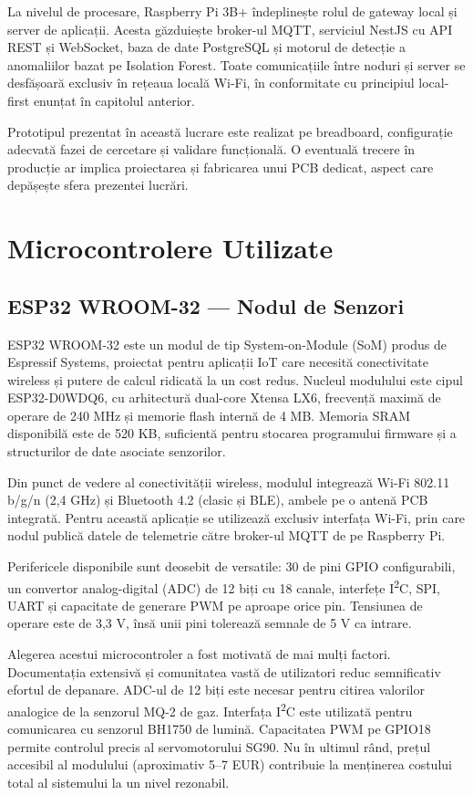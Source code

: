\documentclass[12pt, twoside, a4paper]{report}
\begin{document}
La nivelul de procesare, Raspberry Pi 3B+ îndeplinește rolul de gateway local și
server de aplicații. Acesta găzduiește broker-ul MQTT, serviciul NestJS cu API REST
și WebSocket, baza de date PostgreSQL și motorul de detecție a anomaliilor bazat pe
Isolation Forest. Toate comunicațiile între noduri și server se desfășoară exclusiv în
rețeaua locală Wi-Fi, în conformitate cu principiul local-first enunțat în capitolul anterior.

Prototipul prezentat în această lucrare este realizat pe breadboard, configurație adecvată
fazei de cercetare și validare funcțională. O eventuală trecere în producție ar implica
proiectarea și fabricarea unui PCB dedicat, aspect care depășește sfera prezentei lucrări.

\section{Microcontrolere Utilizate}

\subsection{ESP32 WROOM-32 --- Nodul de Senzori}

ESP32 WROOM-32 este un modul de tip System-on-Module (SoM) produs de Espressif Systems,
proiectat pentru aplicații IoT care necesită conectivitate wireless și putere de calcul
ridicată la un cost redus. Nucleul modulului este cipul ESP32-D0WDQ6, cu arhitectură
dual-core Xtensa LX6, frecvență maximă de operare de 240 MHz și memorie flash internă
de 4 MB. Memoria SRAM disponibilă este de 520 KB, suficientă pentru stocarea programului
firmware și a structurilor de date asociate senzorilor.

Din punct de vedere al conectivității wireless, modulul integrează Wi-Fi 802.11 b/g/n
(2,4 GHz) și Bluetooth 4.2 (clasic și BLE), ambele pe o antenă PCB integrată. Pentru
această aplicație se utilizează exclusiv interfața Wi-Fi, prin care nodul publică datele
de telemetrie către broker-ul MQTT de pe Raspberry Pi.

Perifericele disponibile sunt deosebit de versatile: 30 de pini GPIO configurabili, un
convertor analog-digital (ADC) de 12 biți cu 18 canale, interfețe I\textsuperscript{2}C,
SPI, UART și capacitate de generare PWM pe aproape orice pin. Tensiunea de operare este
de 3,3 V, însă unii pini tolerează semnale de 5 V ca intrare.

Alegerea acestui microcontroler a fost motivată de mai mulți factori. Documentația
extensivă și comunitatea vastă de utilizatori reduc semnificativ efortul de depanare.
ADC-ul de 12 biți este necesar pentru citirea valorilor analogice de la senzorul MQ-2
de gaz. Interfața I\textsuperscript{2}C este utilizată pentru comunicarea cu senzorul
BH1750 de lumină. Capacitatea PWM pe GPIO18 permite controlul precis al servomotorului
SG90. Nu în ultimul rând, prețul accesibil al modulului (aproximativ 5--7 EUR) contribuie
la menținerea costului total al sistemului la un nivel rezonabil.
\end{document}
